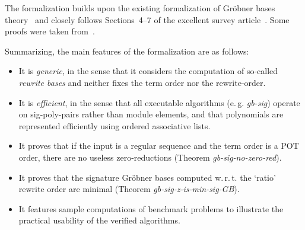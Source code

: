 \documentclass[11pt,a4paper]{article}
\begin{document}
The formalization builds upon the existing formalization of Gr\"obner bases 
theory~\cite{Immler2016} and closely follows Sections~4--7 of the excellent survey 
article~\cite{Eder2017}. Some proofs were taken from~\cite{Roune2012,Eder2013}.

Summarizing, the main features of the formalization are as follows:
\begin{itemize}
  \item It is \emph{generic}, in the sense that it considers the computation of so-called 
\emph{rewrite bases} and neither fixes the term order nor the rewrite-order.

  \item It is \emph{efficient}, in the sense that all executable algorithms (e.\,g. 
\textit{gb-sig}) operate on sig-poly-pairs rather than module elements, and that polynomials are 
represented efficiently using ordered associative lists.

  \item It proves that if the input is a regular sequence and the term order is a POT order, there
are no useless zero-reductions (Theorem \textit{gb-sig-no-zero-red}).

  \item It proves that the signature Gr\"obner bases computed w.\,r.\,t. the `ratio' rewrite order 
are minimal (Theorem \textit{gb-sig-z-is-min-sig-GB}).

  \item It features sample computations of benchmark problems to illustrate the practical usability 
of the verified algorithms.
\end{itemize}





\end{document}
